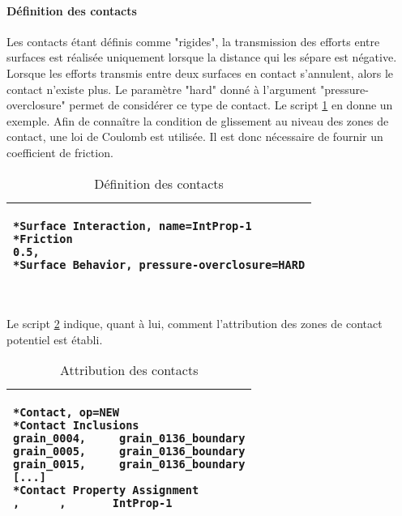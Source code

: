 \paragraph{Définition des contacts\\}
Les contacts étant définis comme "rigides", la transmission des efforts entre surfaces est réalisée uniquement lorsque la distance qui les sépare est négative. Lorsque les efforts transmis entre deux surfaces en contact s'annulent, alors le contact n'existe plus. Le paramètre "hard" donné à l'argument "pressure-overclosure" permet de considérer ce type de contact. Le script \ref{script05:contact} en donne un exemple. Afin de connaître la condition de glissement au niveau des zones de contact, une loi de Coulomb est utilisée. Il est donc nécessaire de fournir un coefficient de friction.
\begin{table}[h]\centering
	\begin{tabular}{p{}}
		\hline
		\begin{lstlisting}[language={}, breaklines=true]
*Surface Interaction, name=IntProp-1
*Friction
0.5,
*Surface Behavior, pressure-overclosure=HARD
		\end{lstlisting}\\
		\hline
	\end{tabular}
	\caption{\label{script05:contact}Définition des contacts}
\end{table}
\\Le script \ref{script05:contact_bis} indique, quant à lui, comment l'attribution des zones de contact potentiel est établi.
\begin{table}[h]\centering
	\begin{tabular}{p{}}
		\hline
		\begin{lstlisting}[language={}, breaklines=true]
*Contact, op=NEW
*Contact Inclusions
grain_0004,     grain_0136_boundary
grain_0005,     grain_0136_boundary
grain_0015,     grain_0136_boundary
[...]
*Contact Property Assignment
,      ,       IntProp-1
		\end{lstlisting}\\
		\hline
	\end{tabular}
	\caption{\label{script05:contact_bis}Attribution des contacts}
\end{table}

